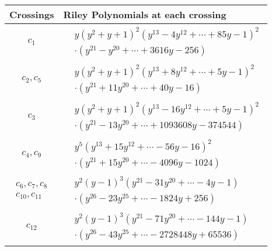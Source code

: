 \documentclass[1p]{elsarticle_modified}
\theoremstyle{definition}
\begin{document}
\begin{tabular}{m{50pt}|m{274pt}}
Crossings & \hspace{64pt}Riley Polynomials at each crossing \\
\hline $$\begin{aligned}c_{1}\end{aligned}$$&$\begin{aligned}
&y(y^2+y+1)^2(y^{13}-4 y^{12}+\cdots+85 y-1)^{2}\\
&\cdot(y^{21}- y^{20}+\cdots+3616 y-256)
\end{aligned}$\\
\hline $$\begin{aligned}c_{2},c_{5}\end{aligned}$$&$\begin{aligned}
&y(y^2+y+1)^2(y^{13}+8 y^{12}+\cdots+5 y-1)^{2}\\
&\cdot(y^{21}+11 y^{20}+\cdots+40 y-16)
\end{aligned}$\\
\hline $$\begin{aligned}c_{3}\end{aligned}$$&$\begin{aligned}
&y(y^2+y+1)^2(y^{13}-16 y^{12}+\cdots+5 y-1)^{2}\\
&\cdot(y^{21}-13 y^{20}+\cdots+1093608 y-374544)
\end{aligned}$\\
\hline $$\begin{aligned}c_{4},c_{9}\end{aligned}$$&$\begin{aligned}
&y^5(y^{13}+15 y^{12}+\cdots-56 y-16)^{2}\\
&\cdot(y^{21}+15 y^{20}+\cdots-4096 y-1024)
\end{aligned}$\\
\hline $$\begin{aligned}c_{6},c_{7},c_{8}\\c_{10},c_{11}\end{aligned}$$&$\begin{aligned}
&y^2(y-1)^3(y^{21}-31 y^{20}+\cdots-4 y-1)\\
&\cdot(y^{26}-23 y^{25}+\cdots-1824 y+256)
\end{aligned}$\\
\hline $$\begin{aligned}c_{12}\end{aligned}$$&$\begin{aligned}
&y^2(y-1)^3(y^{21}-71 y^{20}+\cdots-144 y-1)\\
&\cdot(y^{26}-43 y^{25}+\cdots-2728448 y+65536)
\end{aligned}$\\
\hline
\end{tabular}
\vskip 2pc
\end{document}

